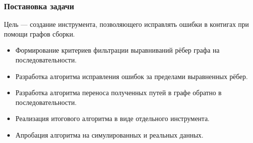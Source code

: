 \documentclass[aspectratio=169]{beamer}
\begin{document}
\begin{frame}\frametitle{Постановка задачи}
Цель --- создание инструмента, позволяющего исправлять ошибки в контигах при помощи графов сборки. 
\begin{itemize}
    \item Формирование критериев фильтрации выравниваний рёбер графа на последовательности.
    \item Разработка алгоритма исправления ошибок за пределами выравненных рёбер.
    \item Разработка алгоритма переноса полученных путей в графе обратно в последовательности.
    \item Реализация итогового алгоритма в виде отдельного инструмента.
    \item Апробация алгоритма на симулированных и реальных данных.
\end{itemize}

\end{frame}

\end{document}
